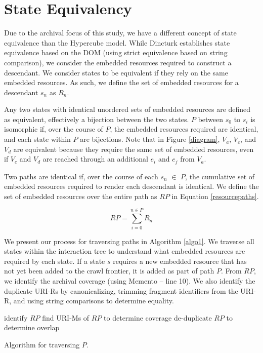 \documentclass{sig-alternate}
\begin{document}
\section{State Equivalency}
\label{paths}
Due to the archival focus of this study, we have a different concept of state equivalence than the Hypercube model. While Dincturk establishes state equivalence based on the DOM (using strict equivalence based on string comparison), we consider the embedded resources required to construct a descendant. We consider states to be equivalent if they rely on the same embedded resources. As such, we define the set of embedded resources for a descendant $s_n$ as $R_n$. 

Any two states with identical unordered sets of embedded resources are defined as equivalent, effectively a bijection between the two states. $P$ between $s_0$ to $s_i$ is isomorphic if, over the course of $P$, the embedded resources required are identical, and each state within $P$ are bijections. Note that in Figure \ref{diagram}, $V_a$, $V_c$, and $V_d$ are equivalent because they require the same set of embedded resources, even if $V_c$ and $V_d$ are reached through an additional $e_i$ and $e_j$ from $V_a$.

Two paths are identical if, over the course of each $s_n$ $\in$ $P$, the cumulative set of embedded resources required to render each descendant is identical. We define the set of embedded resources over the entire path as $RP$ in Equation \ref{resourcepaths}.

\begin{equation}
RP = \sum_{i=0}^{n \in P} R_n
\label{resourcepaths}
\end{equation}

We present our process for traversing paths in Algorithm \ref{algo1}. We traverse all states within the interaction tree to understand what embedded resources are required by each state. If a state $s$ requires a new embedded resource that has not yet been added to the crawl frontier, it is added as part of path $P$. From $RP$, we identify the archival coverage (using Memento -- line 10). We also identify the duplicate URI-Rs by canonicalizing, trimming fragment identifiers from the URI-R, and using string comparisons to determine equality.

\begin{algorithm}
identify $RP$\;
find URI-Ms of $RP$ to determine coverage\;
de-duplicate $RP$ to determine overlap\;

 \caption{Algorithm for traversing $P$.}
  \label{algo1}
\end{algorithm}
\end{document}
